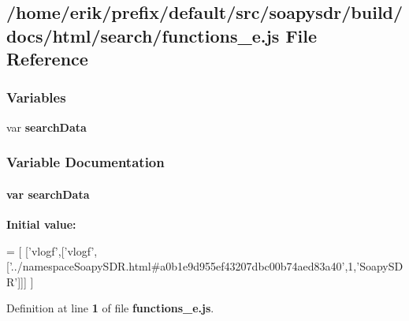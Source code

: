 \subsection{/home/erik/prefix/default/src/soapysdr/build/docs/html/search/functions\+\_\+e.js File Reference}
\label{functions__e_8js}
\subsubsection*{Variables}
\begin{DoxyCompactItemize}
\item 
var {\bf search\+Data}
\end{DoxyCompactItemize}


\subsubsection{Variable Documentation}
\paragraph[{search\+Data}]{\setlength{\rightskip}{0pt plus 5cm}var search\+Data}\label{functions__e_8js_ad01a7523f103d6242ef9b0451861231e}
{\bfseries Initial value\+:}
\begin{DoxyCode}
=
[
  [\textcolor{stringliteral}{'vlogf'},[\textcolor{stringliteral}{'vlogf'},[\textcolor{stringliteral}{'../namespaceSoapySDR.html#a0b1e9d955ef43207dbc00b74aed83a40'},1,\textcolor{stringliteral}{'SoapySDR'}]]]
]
\end{DoxyCode}


Definition at line {\bf 1} of file {\bf functions\+\_\+e.\+js}.

